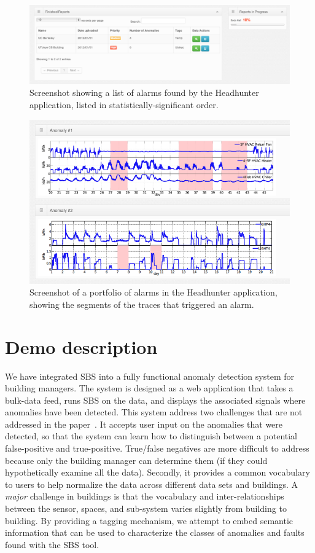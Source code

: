 
\begin{figure}[t!]
 \includegraphics[width=.5\textwidth]{img/eh_alarmlist.png}
 \caption{Screenshot showing a list of alarms found by the Headhunter application, listed in statistically-significant order.}
 \label{fig:ehalarmlist}
\end{figure}

\begin{figure}[t!]
 \includegraphics[width=.5\textwidth]{img/eh_screenshot1.png}
 \caption{Screenshot of a portfolio of alarms in the Headhunter application, showing the segments of the traces that triggered an alarm.}
 \label{fig:ehgraphs}
\end{figure}


\section{Demo description}
\label{sec:demo}
We have integrated SBS into a fully functional anomaly detection system for building managers.  The system 
is designed as a web application that takes a bulk-data feed, runs SBS on the data, and displays the associated 
signals where anomalies have been detected.  This system address two challenges that are not addressed in the 
paper~\cite{sbs:ipsn2013}.  It accepts user input on the anomalies that were detected, so that the system can learn
how to distinguish between a potential false-positive and true-positive.  True/false negatives are more difficult
to address because only the building manager can determine them (if they could hypothetically examine all the data).
Secondly, it provides a common vocabulary
to users to help normalize the data across different data sets and buildings.  A \emph{major} challenge in buildings 
is that the vocabulary and inter-relationships between the sensor, spaces, and sub-system varies slightly
from building to building.  By providing a tagging 
mechanism, we attempt to embed semantic information
that can be used to characterize the classes of anomalies and faults found with the SBS tool.